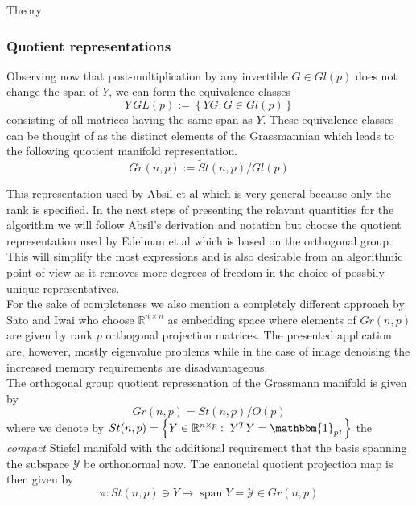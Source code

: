 \begin{chapter}{Theory}
\subsubsection{Quotient representations} %
\label{ssub:Quotient representations}
Observing now that post-multiplication by any invertible $G\in Gl(p)$ does not change the span of $Y$, we can form the equivalence classes
\begin{equation}
    Y\,GL(p) := \left\lbrace YG: G\in Gl(p)\right\rbrace
\end{equation}
consisting of all matrices having the same span as $Y$. These equivalence classes can be thought of as the distinct elements of the Grassmannian which
leads to the following quotient manifold representation.\\
\begin{equation}
    Gr(n,p):=\tilde St(n,p) / Gl(p)
\end{equation}

This representation used by Absil et al\cite{AbsilGrasmman} which is very general because only the rank is specified. In the next steps of presenting the relavant quantities for the
algorithm we will follow Absil's derivation and notation but choose the quotient representation used by Edelman et al \cite{EAS} which is based on the orthogonal group. This will simplify the
most expressions and is also desirable from an algorithmic point of view as it removes more degrees of freedom in the choice of possbily unique representatives.\\

For the sake of completeness we also mention a completely different approach by Sato and Iwai \cite{SatoIwai} who choose $\mathbb{R}^{n\times n}$ as embedding space
where elements of $Gr(n,p)$ are given by rank $p$ orthogonal projection matrices. The presented application are, however, mostly eigenvalue problems while in the case
of image denoising the increased memory requirements are disadvantageous.\\

The orthogonal group quotient represenation of the Grassmann manifold is given by
\begin{equation}
    Gr(n,p) = St(n,p) / O(p) %
\end{equation}
where we denote by $St(n,p)=\left\lbrace Y\in\mathbb{R}^{n\times p}:\; Y^TY=\mathbbm{1}_p,\right\rbrace$ the \emph{compact} Stiefel manifold with the additional
requirement that the basis spanning the subspace $\mathcal{Y}$ be orthonormal now. The canoncial quotient projection map is then given by
\begin{equation}
    \pi : St(n,p)\ni Y \mapsto \operatorname{span} Y=\mathcal{Y} \in Gr(n, p)
\end{equation}


\end{chapter}
